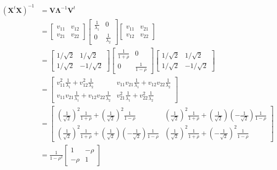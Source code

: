 \documentclass[
]{book}
\begin{document}
\begin{align*}
(\bm X^t \bm X)^{-1} & =  \bm V \bm \Lambda^{-1} \bm V^t \\   
 &  = 
 \begin{bmatrix} 
 v_{11} &  v_{12}\\
 v_{21} &  v_{22}
\end{bmatrix}
 \begin{bmatrix} 
\frac{1}{\lambda_1} & 0 \\
0 & \frac{1}{\lambda_2}
\end{bmatrix} 
\begin{bmatrix} 
 v_{11} &  v_{21}\\
 v_{12} &  v_{22}
\end{bmatrix} \\
&= 
\begin{bmatrix} 
1/\sqrt{2} &  1/\sqrt{2}\\
1/\sqrt{2} &  -1/\sqrt{2}
\end{bmatrix}
 \begin{bmatrix} 
\frac{1}{1+\rho} & 0 \\
0 & \frac{1}{1-\rho}
\end{bmatrix}
\begin{bmatrix} 
1/\sqrt{2} &  1/\sqrt{2}\\
1/\sqrt{2} &  -1/\sqrt{2}
\end{bmatrix} \\
&=
 \begin{bmatrix} 
 v_{11}^2 \frac{1}{\lambda_1} +   v_{12}^2 \frac{1}{\lambda_2} &
 v_{11}  v_{21} \frac{1}{\lambda_1} +  v_{12}  v_{22} \frac{1}{\lambda_2} \\
 v_{11}  v_{21} \frac{1}{\lambda_1} +  v_{12}  v_{22} \frac{1}{\lambda_2}   & 
 v_{21}^2 \frac{1}{\lambda_1} +   v_{22}^2 \frac{1}{\lambda_2}
\end{bmatrix} \\
&= 
\begin{bmatrix} 
(\frac{1}{\sqrt{2}})^2 \frac{1}{1+\rho} +  (\frac{1}{\sqrt{2}})^2 \frac{1}{1-\rho} &
(\frac{1}{\sqrt{2}})^2 \frac{1}{1+\rho} + (\frac{1}{\sqrt{2}}) (-\frac{1}{\sqrt{2}}) \frac{1}{1-\rho} \\
(\frac{1}{\sqrt{2}})^2 \frac{1}{1+\rho} + (\frac{1}{\sqrt{2}}) (-\frac{1}{\sqrt{2}}) \frac{1}{1-\rho}  & 
(\frac{1}{\sqrt{2}})^2 \frac{1}{1+\rho} +  (-\frac{1}{\sqrt{2}})^2 \frac{1}{1-\rho} 
\end{bmatrix} \\
& =
\frac{1}{1-\rho^2}
\begin{bmatrix}
1  & -\rho \\
-\rho & 1
\end{bmatrix}
\end{align*}
\end{document}

